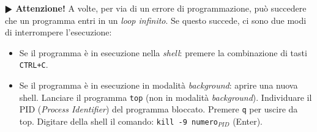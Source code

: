 \documentclass[11pt]{article}
\begin{document}
\begin{mdframed}[backgroundcolor=panna]
\textbf{$\RHD$ Attenzione!}
A volte, per via di un errore di programmazione, può succedere che un programma entri in un {\em loop infinito}.
Se questo succede, ci sono due modi di interrompere l'esecuzione:
\begin{itemize}
\item Se il programma è in esecuzione nella {\em shell\/}: premere la combinazione di tasti \texttt{CTRL+C}.
\item Se il programma è in esecuzione in modalit\`a {\em background\/}:
aprire una nuova shell. Lanciare il programma \texttt{top} (non in modalit\`a
 {\em background\/}). Individuare il PID ({\em Process Identifier\/}) del programma bloccato. Premere \texttt{q} per uscire da top.
Digitare della shell il comando: \texttt{kill -9 numero$_{PID}$} (Enter).
\end{itemize}
\end{mdframed}

 
\end{document}
